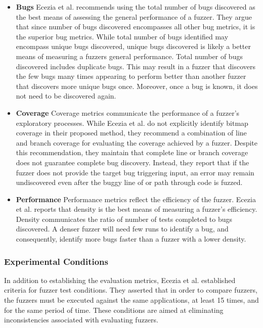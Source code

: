 \begin{itemize}
    \item \textbf{Bugs} Ecezia et al. recommends using the total number of
    bugs discovered as the best means of assessing the general performance 
    of a fuzzer. They argue that since number of bugs discovered 
    encompasses all other bug metrics, it is the superior bug metrics. 
    While total number of bugs identified may encompass unique bugs 
    discovered, unique bugs discovered is likely a better means of 
    measuring a fuzzers general performance. Total number of bugs 
    discovered includes duplicate bugs. This may result in a fuzzer that 
    discovers the few bugs many times appearing to perform better than 
    another fuzzer that discovers more unique bugs once. Moreover, once a 
    bug is known, it does not need to be discovered again.
    \item \textbf{Coverage} Coverage metrics communicate the performance 
    of a fuzzer's exploratory processes. While Ecezia et al. do not 
    explicitly identify bitmap coverage in their proposed method, they 
    recommend a combination of line and branch coverage for evaluating the 
    coverage achieved by a fuzzer. Despite this recommendation, they 
    maintain that complete line or branch coverage does not guarantee 
    complete bug discovery. Instead, they report that if the fuzzer does 
    not provide the target bug triggering input, an error may remain 
    undiscovered even after the buggy line of or path through code is 
    fuzzed. 
    \item \textbf{Performance} Performance metrics reflect the efficiency 
    of the fuzzer. Ecezia et al. reports that density is the best means of 
    measuring a fuzzer's efficiency. Density communicates the ratio of 
    number of tests completed to bugs discovered. A denser fuzzer will 
    need few runs to identify a bug, and consequently, identify more bugs 
    faster than a fuzzer with a lower density. 
\end{itemize}

\subsubsection{Experimental Conditions}
In addition to establishing the evaluation metrics, Ecezia et al. established  criteria for fuzzer test conditions. They asserted that in order to compare fuzzers, the fuzzers must be executed against the same applications, at least 15 times, and for the same period of time. These conditions are aimed at eliminating inconsistencies associated with evaluating fuzzers. 

